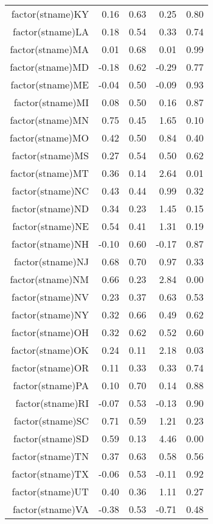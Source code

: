 \begin{table}[ht]
\begin{tabular}{rrrrr}
  factor(stname)KY & 0.16 & 0.63 & 0.25 & 0.80 \\ 
  factor(stname)LA & 0.18 & 0.54 & 0.33 & 0.74 \\ 
  factor(stname)MA & 0.01 & 0.68 & 0.01 & 0.99 \\ 
  factor(stname)MD & -0.18 & 0.62 & -0.29 & 0.77 \\ 
  factor(stname)ME & -0.04 & 0.50 & -0.09 & 0.93 \\ 
  factor(stname)MI & 0.08 & 0.50 & 0.16 & 0.87 \\ 
  factor(stname)MN & 0.75 & 0.45 & 1.65 & 0.10 \\ 
  factor(stname)MO & 0.42 & 0.50 & 0.84 & 0.40 \\ 
  factor(stname)MS & 0.27 & 0.54 & 0.50 & 0.62 \\ 
  factor(stname)MT & 0.36 & 0.14 & 2.64 & 0.01 \\ 
  factor(stname)NC & 0.43 & 0.44 & 0.99 & 0.32 \\ 
  factor(stname)ND & 0.34 & 0.23 & 1.45 & 0.15 \\ 
  factor(stname)NE & 0.54 & 0.41 & 1.31 & 0.19 \\ 
  factor(stname)NH & -0.10 & 0.60 & -0.17 & 0.87 \\ 
  factor(stname)NJ & 0.68 & 0.70 & 0.97 & 0.33 \\ 
  factor(stname)NM & 0.66 & 0.23 & 2.84 & 0.00 \\ 
  factor(stname)NV & 0.23 & 0.37 & 0.63 & 0.53 \\ 
  factor(stname)NY & 0.32 & 0.66 & 0.49 & 0.62 \\ 
  factor(stname)OH & 0.32 & 0.62 & 0.52 & 0.60 \\ 
  factor(stname)OK & 0.24 & 0.11 & 2.18 & 0.03 \\ 
  factor(stname)OR & 0.11 & 0.33 & 0.33 & 0.74 \\ 
  factor(stname)PA & 0.10 & 0.70 & 0.14 & 0.88 \\ 
  factor(stname)RI & -0.07 & 0.53 & -0.13 & 0.90 \\ 
  factor(stname)SC & 0.71 & 0.59 & 1.21 & 0.23 \\ 
  factor(stname)SD & 0.59 & 0.13 & 4.46 & 0.00 \\ 
  factor(stname)TN & 0.37 & 0.63 & 0.58 & 0.56 \\ 
  factor(stname)TX & -0.06 & 0.53 & -0.11 & 0.92 \\ 
  factor(stname)UT & 0.40 & 0.36 & 1.11 & 0.27 \\ 
  factor(stname)VA & -0.38 & 0.53 & -0.71 & 0.48 \\ 

\end{tabular}
\end{table}
